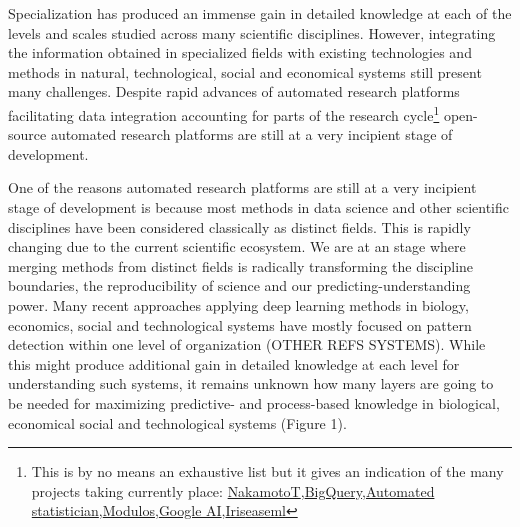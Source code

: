 \documentclass[authoryear,1p,12pt]{elsarticle}
\begin{document}
Specialization has produced an immense gain in detailed knowledge at
each of the levels and scales studied across many scientific
disciplines. However, integrating the information obtained in
specialized fields with existing technologies and methods in natural,
technological, social and economical systems still present many
challenges. Despite rapid advances of automated research platforms
facilitating data integration accounting for parts of the research
cycle\footnote{This is by no means an exhaustive list but it gives an
  indication of the many projects taking currently place:
  \href{https://www.nterminal.com}{NakamotoT},\href{https://cloud.google.com/bigquery/}{BigQuery},\href{https://www.automaticstatistician.com/index/}{Automated
    statistician},\href{http://www.modulos.ai/}{Modulos},\href{https://ai.google/}{Google
    AI},\href{https://iris.ai}{Iris}\href{https://github.com/DS3Lab/easeml}{easeml}}
open-source automated research platforms are still at a very incipient
stage of development.

One of the reasons automated research platforms are still at a very
incipient stage of development is because most methods in data science
and other scientific disciplines have been considered classically as
distinct fields. This is rapidly changing due to the current
scientific ecosystem. We are at an stage where merging methods from
distinct fields is radically transforming the discipline boundaries,
the reproducibility of science and our predicting-understanding
power\citep{Reichsteietal2019}. Many recent approaches applying deep
learning methods in biology, economics, social and technological
systems have mostly focused on pattern detection within one level of
organization \citep{Sheehan&Song:2016} (OTHER REFS SYSTEMS). While
this might produce additional gain in detailed knowledge at each level
for understanding such systems, it remains unknown how many layers are
going to be needed for maximizing predictive- and process-based
knowledge in biological, economical social and technological systems
(Figure 1).
\end{document}
